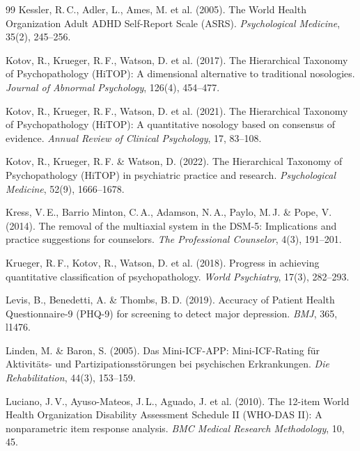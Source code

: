 \documentclass[11pt,a4paper]{article}
\begin{document}
\begin{thebibliography}{99}
Kessler, R.\,C., Adler, L., Ames, M. et al. (2005).
\newblock The World Health Organization Adult ADHD Self-Report Scale (ASRS).
\newblock \textit{Psychological Medicine}, 35(2), 245--256.

Kotov, R., Krueger, R.\,F., Watson, D. et al. (2017).
\newblock The Hierarchical Taxonomy of Psychopathology (HiTOP): A dimensional alternative to traditional nosologies.
\newblock \textit{Journal of Abnormal Psychology}, 126(4), 454--477.

Kotov, R., Krueger, R.\,F., Watson, D. et al. (2021).
\newblock The Hierarchical Taxonomy of Psychopathology (HiTOP): A quantitative nosology based on consensus of evidence.
\newblock \textit{Annual Review of Clinical Psychology}, 17, 83--108.

Kotov, R., Krueger, R.\,F. \& Watson, D. (2022).
\newblock The Hierarchical Taxonomy of Psychopathology (HiTOP) in psychiatric practice and research.
\newblock \textit{Psychological Medicine}, 52(9), 1666--1678.

Kress, V.\,E., Barrio Minton, C.\,A., Adamson, N.\,A., Paylo, M.\,J. \& Pope, V. (2014).
\newblock The removal of the multiaxial system in the DSM-5: Implications and practice suggestions for counselors.
\newblock \textit{The Professional Counselor}, 4(3), 191--201.

Krueger, R.\,F., Kotov, R., Watson, D. et al. (2018).
\newblock Progress in achieving quantitative classification of psychopathology.
\newblock \textit{World Psychiatry}, 17(3), 282--293.

Levis, B., Benedetti, A. \& Thombs, B.\,D. (2019).
\newblock Accuracy of Patient Health Questionnaire-9 (PHQ-9) for screening to detect major depression.
\newblock \textit{BMJ}, 365, l1476.

Linden, M. \& Baron, S. (2005).
\newblock Das Mini-ICF-APP: Mini-ICF-Rating f\"ur Aktivit\"ats- und Partizipationsst\"orungen bei psychischen Erkrankungen.
\newblock \textit{Die Rehabilitation}, 44(3), 153--159.

Luciano, J.\,V., Ayuso-Mateos, J.\,L., Aguado, J. et al. (2010).
\newblock The 12-item World Health Organization Disability Assessment Schedule II (WHO-DAS II): A nonparametric item response analysis.
\newblock \textit{BMC Medical Research Methodology}, 10, 45.


\end{thebibliography}
\end{document}
